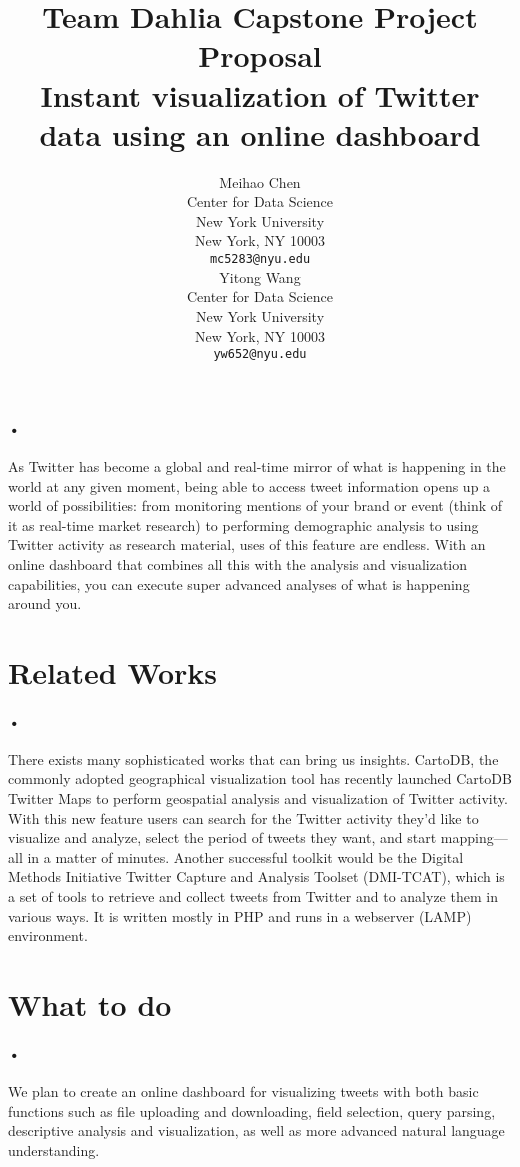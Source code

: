 \documentclass{article} %
\title{Team Dahlia Capstone Project Proposal\\ Instant visualization of Twitter data using an online dashboard
}
\author{
Meihao Chen \\
Center for Data Science\\
New York University\\
New York, NY 10003 \\
\texttt{mc5283@nyu.edu} \\
\And
Yitong Wang \\
Center for Data Science\\
New York University\\
New York, NY 10003 \\
\texttt{yw652@nyu.edu} \\
}
\begin{document}
\maketitle
\paragraph{•}
As Twitter has become a global and real-time mirror of what is happening in the world at any given moment, being able to access tweet information opens up a world of possibilities: from monitoring mentions of your brand or event (think of it as real-time market research) to performing demographic analysis to using Twitter activity as research material, uses of this feature are endless. With an online dashboard that combines all this with the analysis and visualization capabilities, you can execute super advanced analyses of what is happening around you.

\section{Related Works}
\paragraph{•}
There exists many sophisticated works that can bring us insights. CartoDB, the commonly adopted geographical visualization tool has recently launched CartoDB Twitter Maps to perform geospatial analysis and visualization of Twitter activity. With this new feature users can search for the Twitter activity they'd like to visualize and analyze, select the period of tweets they want, and start mapping—all in a matter of minutes. Another successful toolkit would be the Digital Methods Initiative Twitter Capture and Analysis Toolset (DMI-TCAT), which is a set of tools to retrieve and collect tweets from Twitter and to analyze them in various ways. It is written mostly in PHP and runs in a webserver (LAMP) environment.




\section{What to do}
\paragraph{•}
We plan to create an online dashboard for visualizing tweets with both basic functions such as file uploading and downloading, field selection, query parsing, descriptive analysis and visualization, as well as more advanced natural language understanding.
\end{document}
